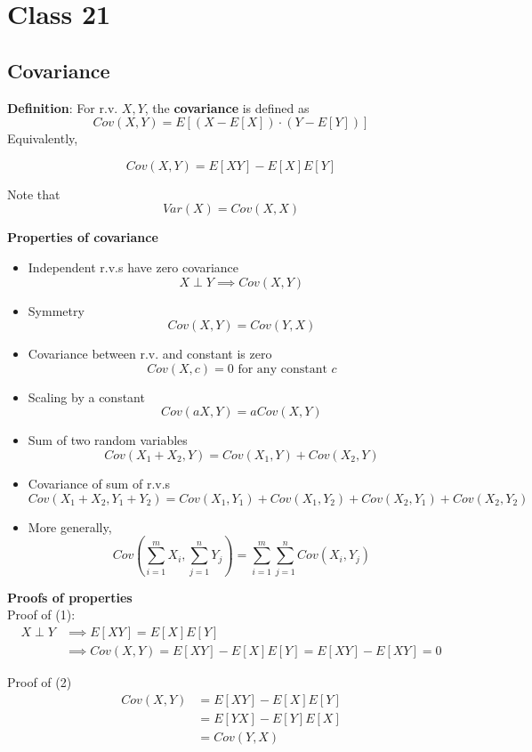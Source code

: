 \chapter{Class 21}

\section{Covariance}
\begin{framed}
   \textbf{Definition}: For r.v. $X, Y$, the \textbf{covariance} is defined as 
    \[
       Cov(X, Y) = E \left[(X - E[X]) \cdot \left(Y - E[Y] \right) \right]
   \] 
   Equivalently,

    \[
       Cov(X, Y) = E [XY] - E[X] E[Y]
   \] 

   Note that
   \[
     Var(X) = Cov(X, X)
   \] 
\end{framed}
\textbf{Properties of covariance}
\begin{itemize}
   \item Independent r.v.s have zero covariance
      \[
        X \perp Y \implies Cov(X, Y)
      \] 
   \item Symmetry
      \[
        Cov(X, Y) = Cov(Y, X)
      \] 
   
   \item Covariance between r.v. and constant is zero
      \[
        Cov(X, c) = 0 \text{ for any constant } c
      \] 
   \item Scaling by a constant
   \[
     Cov(aX, Y) = aCov(X, Y)
   \] 
   \item Sum of two random variables
   \[
     Cov(X_1 + X_2, Y) = Cov(X_1, Y) + Cov(X_2, Y)
   \] 
   \item Covariance of sum of r.v.s
   \[
     Cov(X_1 + X_2, Y_1 + Y_2) = Cov(X_1, Y_1) + Cov(X_1, Y_2) + Cov(X_2, Y_1) + Cov(X_2, Y_2)
   \] 
\item More generally,
   \[
      Cov \left( \sum_{i = 1}^{m} X_i, \sum_{j = 1}^{n} Y_j \right) = \sum_{i = 1}^{m} \sum_{j = 1}^{n} Cov(X_i, Y_j )
   \] 
\end{itemize}

\textbf{Proofs of properties} \\

Proof of (1):
\begin{align*}
   X \perp Y &\implies E[XY] = E[X] E[Y] \\
             &\implies Cov(X, Y) = E[XY] - E[X] E[Y] = E[XY] - E[XY] = 0
\end{align*}

Proof of (2) 
\begin{align*}
   Cov(X, Y) &= E[XY] - E[X]E[Y] \\
            &= E[YX] - E[Y]E[X] \\
            &= Cov(Y, X)
\end{align*}

